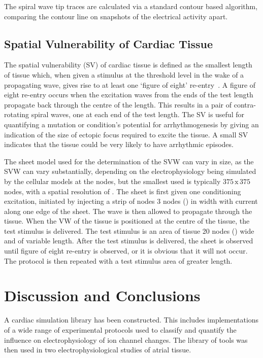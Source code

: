 The spiral wave tip traces are calculated via a standard contour based
algorithm, comparing the  contour line on snapshots of the electrical
activity  apart.

\subsection{Spatial Vulnerability of Cardiac Tissue}

The spatial vulnerability (SV) of cardiac tissue is defined as the smallest
length of tissue which, when given a stimulus at the threshold level in the wake
of a propagating wave, gives rise to at least one `figure of eight'
re-entry~\cite{Zou2005}.
A figure of eight re-entry occurs when the excitation waves from the ends of the
test length propagate back through the centre of the length.
This results in a pair of contra-rotating spiral waves, one at each end of the
test length.
The SV is useful for quantifying a mutation or condition's potential for
arrhythmogenesis by giving an indication of the size of ectopic focus required
to excite the tissue.
A small SV indicates that the tissue could be very likely to have arrhythmic
episodes.

The sheet model used for the determination of the SVW can vary in size, as the
SVW can vary substantially, depending on the electrophysiology being simulated
by the cellular models at the nodes, but the smallest used is typically
$375\,\text{x}\,375$ nodes, with a spatial resolution of .  The sheet is first given one
conditioning excitation, initiated by injecting a strip of nodes 3 nodes
() in width with current along one edge of the sheet.  The wave is then
allowed to propagate through the tissue.  When the VW of the tissue is
positioned at the centre of the tissue, the test stimulus is delivered.  The
test stimulus is an area of tissue 20 nodes () wide and of variable length.
After the test stimulus is delivered, the sheet is observed until figure of
eight re-entry is observed, or it is obvious that it will not occur.  The
protocol is then repeated with a test stimulus area of greater length.




\section{Discussion and Conclusions}

A cardiac simulation library has been constructed.
This includes implementations of a wide range of experimental protocols used to
classify and quantify the influence on electrophysiology of ion channel changes.
The library of tools was then used in two electrophysiological studies of atrial
tissue.

